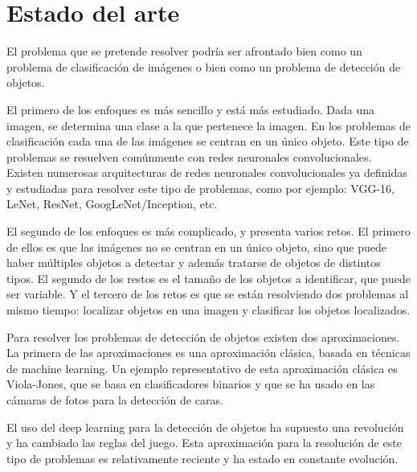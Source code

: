 \section{Estado del arte}
\label{sec:estado_del_arte}


El problema que se pretende resolver podría ser afrontado bien como un problema de clasificación de imágenes o bien como un problema de detección de objetos.

El primero de los enfoques es más sencillo y está más estudiado. Dada una imagen, se determina una clase a la que pertenece la imagen. En los problemas de clasificación cada una de las imágenes se centran en un único objeto. Este tipo de problemas se resuelven comúnmente con redes neuronales convolucionales. Existen numerosas arquitecturas de redes neuronales convolucionales ya definidas y estudiadas para resolver este tipo de problemas, como por ejemplo: VGG-16, LeNet, ResNet, GoogLeNet/Inception, etc.

El segundo de los enfoques es más complicado, y presenta varios retos. El primero de ellos es que las imágenes no se centran en un único objeto, sino que puede haber múltiples objetos a detectar y además tratarse de objetos de distintos tipos. El segundo de los restos es el tamaño de los objetos a identificar, que puede ser variable. Y el tercero de los retos es que se están resolviendo dos problemas al mismo tiempo: localizar objetos en una imagen y clasificar los objetos localizados.

Para resolver los problemas de detección de objetos existen dos aproximaciones. La primera de las aproximaciones es una aproximación clásica, basada en técnicas de machine learning. Un ejemplo representativo de esta aproximación clásica es Viola-Jones, que se basa en clasificadores binarios y que se ha usado en las cámaras de fotos para la detección de caras.

El uso del deep learning para la detección de objetos ha supuesto una revolución y ha cambiado las reglas del juego. Esta aproximación para la resolución de este tipo de problemas es relativamente reciente y ha estado en constante evolución.

